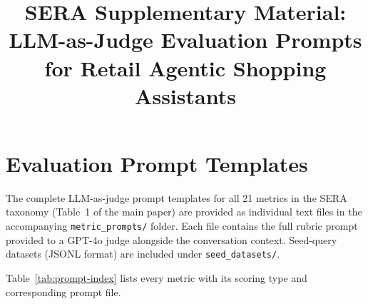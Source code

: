 \documentclass[sigconf,anonymous]{acmart}
\begin{document}
\title{SERA Supplementary Material: LLM-as-Judge Evaluation Prompts\\
for Retail Agentic Shopping Assistants}

\maketitle

\appendix

\section{Evaluation Prompt Templates}
\label{app:prompts}

The complete LLM-as-judge prompt templates for all 21 metrics in the
SERA taxonomy (Table~1 of the main paper) are provided as individual
text files in the accompanying \texttt{metric\_prompts/} folder.
Each file contains the full rubric prompt provided to a GPT-4o judge
alongside the conversation context.  Seed-query datasets
(JSONL format) are included under
\texttt{seed\_datasets/}.

Table~\ref{tab:prompt-index} lists every metric with its scoring type
and corresponding prompt file.
\end{document}
